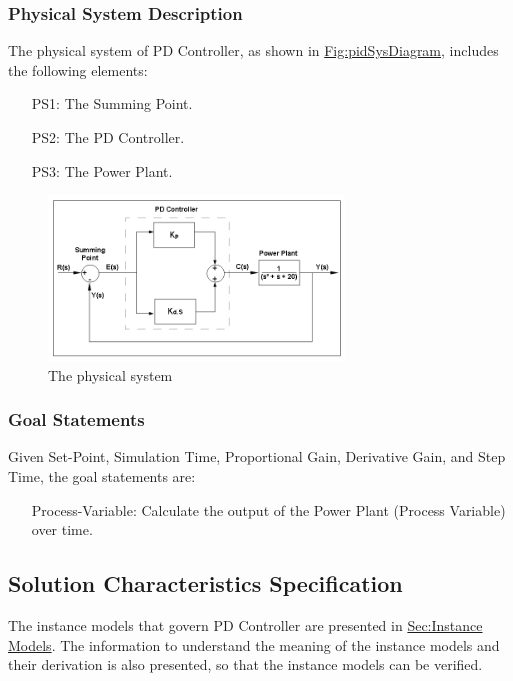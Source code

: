 \documentclass[12pt]{article}
\begin{document}
\subsubsection{Physical System Description}
\label{Sec:PhysSyst}
The physical system of PD Controller, as shown in \hyperref[Figure:pidSysDiagram]{Fig:pidSysDiagram}, includes the following elements:

\begin{itemize}
\item[PS1:]{The Summing Point.}
\item[PS2:]{The PD Controller.}
\item[PS3:]{The Power Plant.}
\end{itemize}
\begin{figure}
\begin{center}
\includegraphics[width=0.7\textwidth]{../../../datafiles/PDController/Fig_PDController.png}
\caption{The physical system}
\label{Figure:pidSysDiagram}
\end{center}
\end{figure}
\subsubsection{Goal Statements}
\label{Sec:GoalStmt}
Given Set-Point, Simulation Time, Proportional Gain, Derivative Gain, and Step Time, the goal statements are:

\begin{itemize}
\item[Process-Variable:\phantomsection\label{processVariable}]{Calculate the output of the Power Plant (Process Variable) over time.}
\end{itemize}
\subsection{Solution Characteristics Specification}
\label{Sec:SolCharSpec}
The instance models that govern PD Controller are presented in \hyperref[Sec:IMs]{Sec:Instance Models}. The information to understand the meaning of the instance models and their derivation is also presented, so that the instance models can be verified.
\end{document}
